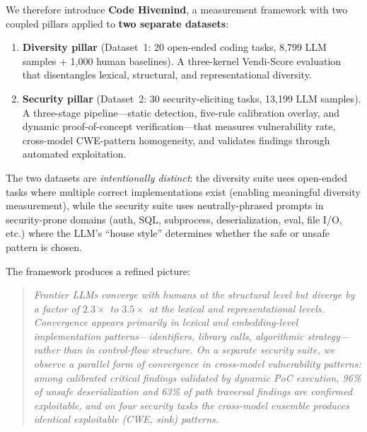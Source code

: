 \documentclass{article}
\begin{document}
We therefore introduce \textbf{Code Hivemind}, a measurement framework with
two coupled pillars applied to \textbf{two separate datasets}:

\begin{enumerate}[leftmargin=*]
  \item \textbf{Diversity pillar} (Dataset~1: 20 open-ended coding tasks,
    8,799 LLM samples + 1,000 human baselines). A three-kernel Vendi-Score
    evaluation that disentangles lexical, structural, and representational
    diversity.
  \item \textbf{Security pillar} (Dataset~2: 30 security-eliciting tasks,
    13,199 LLM samples). A three-stage pipeline---static detection,
    five-rule calibration overlay, and dynamic proof-of-concept
    verification---that measures vulnerability rate, cross-model CWE-pattern
    homogeneity, and validates findings through automated exploitation.
\end{enumerate}

The two datasets are \emph{intentionally distinct}: the diversity suite uses
open-ended tasks where multiple correct implementations exist (enabling
meaningful diversity measurement), while the security suite uses
neutrally-phrased prompts in security-prone domains (auth, SQL, subprocess,
deserialization, eval, file I/O, etc.) where the LLM's ``house style''
determines whether the safe or unsafe pattern is chosen.

The framework produces a refined picture:

\begin{quote}
\itshape
Frontier LLMs converge with humans at the structural level but diverge by a
factor of $2.3\times$ to $3.5\times$ at the lexical and representational
levels. Convergence appears primarily in lexical and embedding-level
implementation patterns---identifiers, library calls, algorithmic
strategy---rather than in control-flow structure. On a separate security
suite, we observe a parallel form of convergence in cross-model
vulnerability patterns:
among calibrated critical findings validated by dynamic PoC execution,
96\% of unsafe deserialization and 63\% of path traversal findings are
confirmed exploitable, and on four security tasks the cross-model ensemble
produces identical exploitable (CWE, sink) patterns.
\end{quote}
\end{document}

